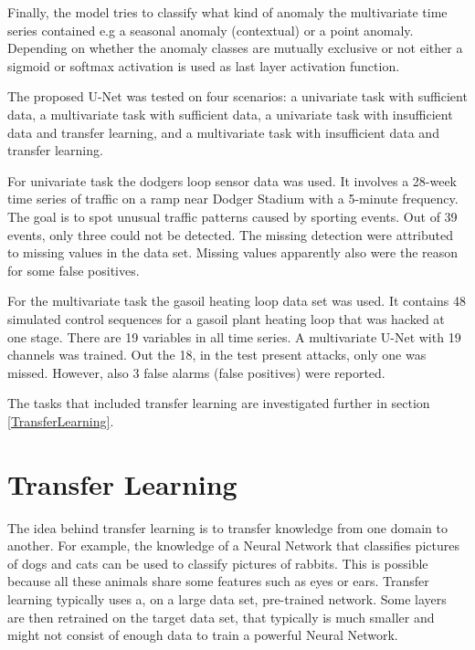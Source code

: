 Finally, the model tries to classify what kind of anomaly the multivariate time series contained e.g a seasonal anomaly (contextual) or a point anomaly. Depending on whether the anomaly classes are mutually exclusive or not either a sigmoid or softmax activation is used as last layer activation function.

The proposed U-Net was tested on four scenarios: a univariate task with sufficient data, a multivariate task with sufficient
data, a univariate task with insufficient data and transfer learning, and a multivariate task with insufficient data and transfer
learning. 

For univariate task the dodgers loop sensor data was used. It involves a 28-week time series of traffic on a ramp near Dodger Stadium with a 5-minute frequency. The goal is to spot unusual traffic patterns caused by sporting events. Out of 39 events, only three could not be detected. The missing detection were attributed to missing values in the data set. Missing values apparently also were the reason for some false positives.

For the multivariate task the gasoil heating loop data set was used. It contains 48 simulated control sequences for a gasoil plant heating loop that was hacked at one stage. There are 19 variables in all time series. A multivariate U-Net with 19 channels was trained. Out the 18, in the test present attacks, only one was missed. However, also 3 false alarms (false positives) were reported. 

The tasks that included transfer learning are investigated further in section \ref{TransferLearning}.

\section{Transfer Learning} 
The idea behind transfer learning is to transfer knowledge from one domain to another. For example, the knowledge of a Neural Network that classifies pictures of dogs and cats can be used to classify pictures of rabbits. This is possible because all these animals share some features such as eyes or ears. Transfer learning typically uses a, on a large data set, pre-trained network. Some layers are then retrained on the target data set, that typically is much smaller and might not consist of enough data to train a powerful Neural Network.

